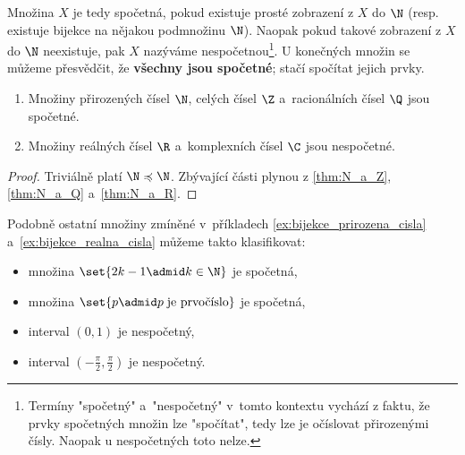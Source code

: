 Množina $X$ je tedy spočetná, pokud existuje prosté zobrazení z $X$ do $\N$ (resp. existuje bijekce na nějakou podmnožinu $\N$). Naopak pokud takové zobrazení z $X$ do $\N$ neexistuje, pak $X$ nazýváme nespočetnou\footnote{Termíny "spočetný" a~"nespočetný" v~tomto kontextu vychází z faktu, že prvky spočetných množin lze "spočítat", tedy lze je očíslovat přirozenými čísly. Naopak u nespočetných toto nelze.}. U konečných množin se můžeme přesvědčit, že \textbf{všechny jsou spočetné}; stačí spočítat jejich prvky.
\begin{theorem}\label{thm:spocetnost_ciselnych_oboru}
    \begin{enumerate}[label=(\roman*)]
        \item Množiny přirozených čísel $\N$, celých čísel $\Z$ a~racionálních čísel $\Q$ jsou spočetné.
        \item Množiny reálných čísel $\R$ a~komplexních čísel $\C$ jsou nespočetné.
    \end{enumerate}
\end{theorem}
\begin{proof}
    Triviálně platí $\N\preccurlyeq\N$. Zbývající části plynou z \ref{thm:N_a_Z}, \ref{thm:N_a_Q} a~\ref{thm:N_a_R}.
\end{proof}
Podobně ostatní množiny zmíněné v~příkladech \ref{ex:bijekce_prirozena_cisla} a~\ref{ex:bijekce_realna_cisla} můžeme takto klasifikovat:
\begin{itemize}
    \item množina $\set{2k-1 \admid k\in\N}$ je spočetná,
    \item množina $\set{p \admid p\;\text{je prvočíslo}}$ je spočetná,
    \item interval $(0,1)$ je nespočetný,
    \item interval $\displaystyle\left(-\frac{\pi}{2},\frac{\pi}{2}\right)$ je nespočetný.
\end{itemize}
\medskip

